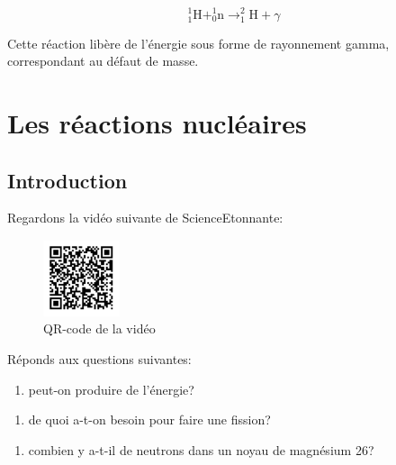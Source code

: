 \documentclass[
  letterpaper,
  DIV=11,
  numbers=noendperiod]{scrartcl}
\providecommand{\tightlist}{%
  \setlength{\itemsep}{0pt}\setlength{\parskip}{0pt}}\usepackage{longtable,booktabs,array}
\begin{document}
\[
^1_1\text{H} + ^1_0\text{n} \rightarrow ^2_1\text{H} + \gamma
\]

Cette réaction libère de l'énergie sous forme de rayonnement gamma,
correspondant au défaut de masse.

\section{Les réactions nucléaires}\label{les-ruxe9actions-nucluxe9aires}

\subsection{Introduction}\label{introduction-1}

Regardons la vidéo suivante de ScienceEtonnante:

\begin{figure}[H]

{\centering \includegraphics[width=0.2\textwidth,height=\textheight]{figures/ff/video-nucl.pdf}

}

\caption{QR-code de la vidéo}

\end{figure}%

Réponds aux questions suivantes:

\begin{enumerate}
\def\labelenumi{\arabic{enumi}.}
\tightlist
\item
  peut-on produire de l'énergie?
\end{enumerate}

\vspace{4cm}

\begin{enumerate}
\def\labelenumi{\arabic{enumi}.}
\setcounter{enumi}{1}
\tightlist
\item
  de quoi a-t-on besoin pour faire une fission?
\end{enumerate}

\vspace{2cm}

\begin{enumerate}
\def\labelenumi{\arabic{enumi}.}
\setcounter{enumi}{2}
\tightlist
\item
  combien y a-t-il de neutrons dans un noyau de magnésium 26?
\end{enumerate}
\end{document}
